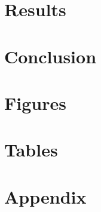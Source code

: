 \documentclass[12pt, a4paper, hidelinks]{article}
\begin{document}
\section{Results} \label{sec:results}

\section{Conclusion} \label{sec:conclusion}

\newpage


\pagebreak

\section{Figures} \label{sec:figures}


\pagebreak

\section{Tables} \label{sec:tables}




\newpage
\appendix
{} %
\section{Appendix} \label{sec:appendix}
\renewcommand{\thefigure}{A.\arabic{figure}}
\renewcommand{\thetable}{A.\arabic{table}}
\setcounter{figure}{0}
\setcounter{table}{0}
\setcounter{footnote}{0}

\end{document}
